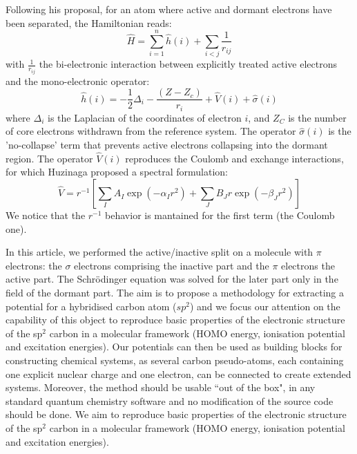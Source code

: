 \documentclass[12pt]{article}
\begin{document}
Following his proposal, for an atom where active and dormant electrons have been separated, the Hamiltonian reads:
\begin{equation}
\label{eq:atomicHamiltonian}
\hat{H} = \sum_{i=1}^n \hat{h}(i) +\sum_{i<j}\frac{1}{r_{ij}}
\end{equation}
with $\frac{1}{r_{ij}}$ the bi-electronic interaction
between explicitly treated active electrons and
the mono-electronic operator:
\begin{equation}
\label{eq:monoElectronicOperator}
\hat{h}(i) = -\frac{1}{2}\Delta_i - \frac{(Z-Z_c)}{r_i}+\hat{V}(i) + \hat{\sigma}(i)
\end{equation}
where $\Delta_i$ is the Laplacian of the coordinates of electron $i$, and 
$Z_C$ is the number of core electrons withdrawn from the reference system.
The operator $\hat{\sigma}(i)$ is the 'no-collapse' term that prevents active electrons
collapsing into the dormant region. The operator $\hat{V}(i)$ reproduces the 
Coulomb and exchange interactions, for which Huzinaga proposed a spectral formulation:
\begin{equation}
\label{eq:HuzinagaMPVersion1Potential}
\hat{V} = r^{-1}\left[\sum_IA_I\exp(-\alpha_I r^2)+\sum_JB_Jr\exp(-\beta_J r^2)\right]
\end{equation}
We notice that the \(r^{-1}\) behavior is mantained for the first term 
(the Coulomb one).
%

In this article, we performed the active/inactive split on a molecule with $\pi$ electrons: the $\sigma$ electrons comprising the inactive part and the $\pi$ electrons the active part.
The Schr\"odinger equation was solved for the later part only in the field of the dormant part.
The aim is to propose a methodology for extracting a potential for a hybridised carbon atom 
($sp^2$) and we focus our attention on the capability of this object to
reproduce basic properties of the electronic structure of the sp$^2$ carbon in a molecular framework 
(HOMO energy, ionisation potential and excitation energies). Our potentials can then be used as 
building blocks for constructing chemical systems, as several carbon pseudo-atoms,
each containing one explicit nuclear charge and one electron, can be connected to create extended
systems.
Moreover, the method should be usable ``out of the box", in any standard quantum chemistry software
and no modification of the source code should be done.
We aim to reproduce basic properties of the electronic structure of the sp$^2$ carbon in a molecular framework (HOMO energy, ionisation potential and excitation energies).
\end{document}
